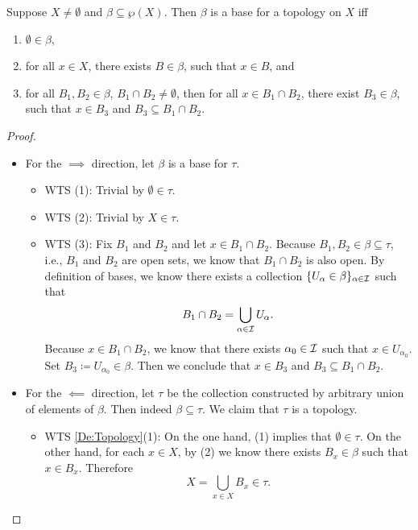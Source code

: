 \documentclass[screen,single]{techreport}
\numberwithin{equation}{section}
\begin{document}
\begin{proposition}\label{Prop:BaseStructure}
	Suppose $X \neq \emptyset$ and $\beta \subseteq \wp(X)$.
	Then $\beta$ is a base for a topology on $X$ iff
	\begin{enumerate}
		\item $\emptyset \in \beta$,
		\item for all $x \in X$, there exists $B \in \beta$, such that $x \in B$, and
		\item for all $B_1,B_2 \in \beta$, $B_1 \cap B_2 \neq \emptyset$, then for all $x \in B_1 \cap B_2$, there exist $B_3 \in \beta$, such that $x \in B_3$ and $B_3 \subseteq B_1 \cap B_2$.
	\end{enumerate}
\end{proposition}
\begin{proof}\
	\begin{itemize}
		\item For the ${\implies}$ direction, let $\beta$ is a base for $\tau$.
		\begin{itemize}
			\item WTS (1): Trivial by $\emptyset \in \tau$.
			\item WTS (2): Trivial by $X \in \tau$.
			\item WTS (3): Fix $B_1$ and $B_2$ and let $x \in B_1 \cap B_2$.
			Because $B_1,B_2 \in \beta \subseteq \tau$, i.e., $B_1$ and $B_2$ are open sets, we know that $B_1 \cap B_2$ is also open.
			By definition of bases, we know there exists a collection $\{U_\alpha \in \beta\}_{\alpha \in \mathcal{I}}$ such that
			\[
			B_1 \cap B_2 = \bigcup_{\alpha \in \mathcal{I}} U_\alpha.
			\]
			Because $x \in B_1 \cap B_2$, we know that there exists $\alpha_0 \in \mathcal{I}$ such that $x \in U_{\alpha_0}$.
			Set $B_3 \coloneqq U_{\alpha_0} \in \beta$.
			Then we conclude that $x \in B_3$ and $B_3 \subseteq B_1 \cap B_2$.
		\end{itemize}
		
		\item For the ${\impliedby}$ direction, let $\tau$ be the collection constructed by arbitrary union of elements of $\beta$.
		Then indeed $\beta \subseteq \tau$.
		We claim that $\tau$ is a topology.
		\begin{itemize}
			\item WTS \cref{De:Topology}(1): On the one hand, (1) implies that $\emptyset \in \tau$.
			On the other hand, for each $x \in X$, by (2) we know there exists $B_x \in \beta$ such that $x \in B_x$.
			Therefore
			\[
			X = \bigcup_{x \in X} B_x \in \tau.
			\]
			

\end{itemize}
\end{itemize}
\end{proof}
\end{document}
